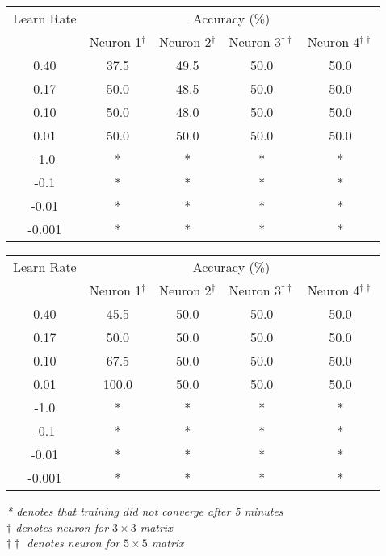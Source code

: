 \documentclass{article}
\begin{document}
\begin{minipage}{\linewidth}
	\begin{tabular}{c|cccc}\label{T4}
		Learn Rate      & \multicolumn{4}{c}{Accuracy (\%)} \\
		& Neuron 1$^{\dagger}$ 	& Neuron 2$^{\dagger}$ 	& Neuron 3$^{\dagger\dagger}$ 	& Neuron 4$^{\dagger\dagger}$ \\
		\hline
		0.40			& 37.5		& 49.5		& 50.0		& 50.0 \\
		0.17			& 50.0		& 48.5		& 50.0		& 50.0 \\
		0.10			& 50.0		& 48.0		& 50.0		& 50.0 \\
		0.01			& 50.0		& 50.0		& 50.0		& 50.0 \\
		-1.0			& *			& *			& *			& *	   \\
		-0.1			& *			& *			& *			& *	   \\
		-0.01			& *			& *			& *			& *	   \\
		-0.001			& *			& *			& *			& *	   \\
	\end{tabular}
\linebreak
\linebreak
	\begin{tabular}{c|cccc}\label{T5}
		Learn Rate      & \multicolumn{4}{c}{Accuracy (\%)} \\
		& Neuron 1$^{\dagger}$ 	& Neuron 2$^{\dagger}$ 	& Neuron 3$^{\dagger\dagger}$ 	& Neuron 4$^{\dagger\dagger}$ \\
		\hline
		0.40			& 45.5   	& 50.0	  	& 50.0		& 50.0 \\
		0.17			& 50.0		& 50.0		& 50.0		& 50.0 \\
		0.10			& 67.5		& 50.0		& 50.0		& 50.0 \\
		0.01			& 100.0		& 50.0		& 50.0		& 50.0 \\
		-1.0			& *			& *			& *			& *	   \\
		-0.1			& *			& *			& *			& *	   \\
		-0.01			& *			& *			& *			& *	   \\
		-0.001			& *			& *			& *			& *	   \\
	\end{tabular}

	\bigskip
	\small
	\textit{* denotes that training did not converge after 5 minutes\\}
	\textit{$\dagger$ denotes neuron for $3\times 3$ matrix\\}
	\textit{$\dagger\dagger$ denotes neuron for $5\times 5$ matrix\\}
\end{minipage}
\end{document}
